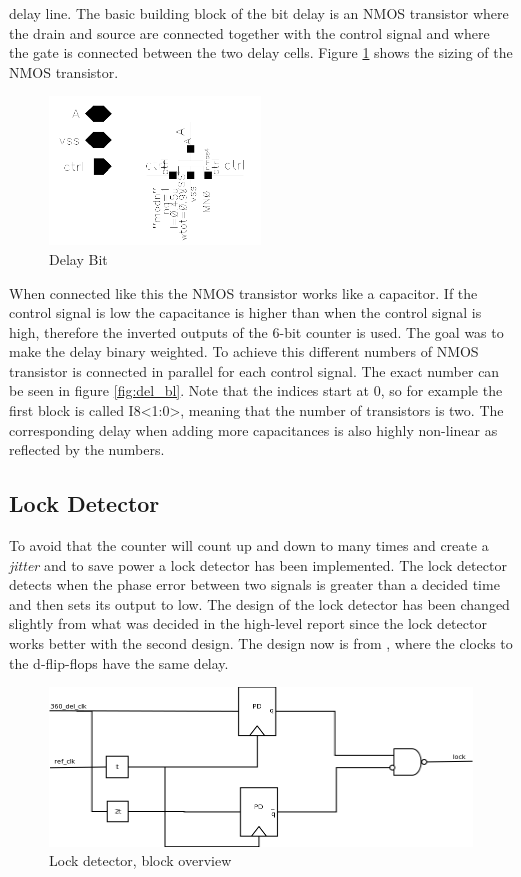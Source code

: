 \documentclass[a4paper,12pt]{article} \usepackage{graphicx}
\begin{document}
delay line. 
The basic building block of the
bit delay is an NMOS transistor where the drain and source are connected
together with the control signal and where the gate is connected between the two
delay cells. Figure \ref{fig:del_bit} shows the sizing of the NMOS transistor.
\begin{figure}[h]
        \centering
        \includegraphics[width=0.5\textwidth]{../Bilder/Delay_Line/Delay_bit.png}
        \caption{Delay Bit}
        \label{fig:del_bit}
\end{figure}
When connected like this the NMOS transistor works like a capacitor. If the control
signal is low the capacitance is higher than when the control signal is high,
therefore the inverted outputs of the 6-bit counter is used. The goal was to
make the delay binary weighted. To achieve this different numbers of NMOS
transistor is connected in parallel for each control signal. The exact number
can be seen in figure \ref{fig:del_bl}. Note that the indices start at 0, so for
example the first block is called I8<1:0>, meaning that the number of
transistors is two. The corresponding delay when adding more capacitances is
also highly non-linear as reflected by the numbers.

\subsection{Lock Detector}
\label{sec:lck_det}
To avoid that the counter will count up and down to many times and
create a \emph{jitter} and to save power a lock detector has been implemented. The
lock detector detects when the phase error between two signals is
greater than a decided time and then sets its output to low. The
design of the lock detector has been changed slightly from what was
decided in the high-level report since the lock detector works better
with the second design. The design now is from \cite{dll_report},
where the clocks to the d-flip-flops have the same delay. 

\begin{figure}[h]
        \centering
        \includegraphics[width=150mm]{../Bilder/Lockdetector.png}
        \caption{Lock detector, block overview}
        \label{fig:LD_block}
\end{figure}
\end{document}

